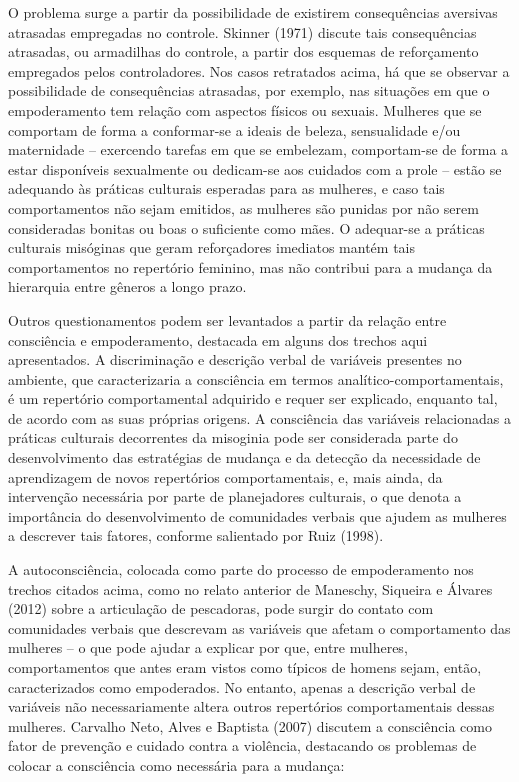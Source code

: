 O problema surge a partir da possibilidade de existirem consequências aversivas atrasadas empregadas no controle. Skinner (1971) discute tais consequências atrasadas, ou armadilhas do controle, a partir dos esquemas de reforçamento empregados pelos controladores. Nos casos retratados acima, há que se observar a possibilidade de consequências atrasadas, por exemplo, nas situações em que o empoderamento tem relação com aspectos físicos ou sexuais. Mulheres que se comportam de forma a conformar-se a ideais de beleza, sensualidade e/ou maternidade – exercendo tarefas em que se embelezam, comportam-se de forma a estar disponíveis sexualmente ou dedicam-se aos cuidados com a prole – estão se adequando às práticas culturais esperadas para as mulheres, e caso tais comportamentos não sejam emitidos, as mulheres são punidas por não serem consideradas bonitas ou boas o suficiente como mães. O adequar-se a práticas culturais misóginas que geram reforçadores imediatos mantém tais comportamentos no repertório feminino, mas não contribui para a mudança da hierarquia entre gêneros a longo prazo.

Outros questionamentos podem ser levantados a partir da relação entre consciência e empoderamento, destacada em alguns dos trechos aqui apresentados. A discriminação e descrição verbal de variáveis presentes no ambiente, que caracterizaria a consciência em termos analítico-comportamentais, é um repertório comportamental adquirido e requer ser explicado, enquanto tal, de acordo com as suas próprias origens. A consciência das variáveis relacionadas a práticas culturais decorrentes da misoginia pode ser considerada parte do desenvolvimento das estratégias de mudança e da detecção da necessidade de aprendizagem de novos repertórios comportamentais, e, mais ainda, da intervenção necessária por parte de planejadores culturais, o que denota a importância do desenvolvimento de comunidades verbais que ajudem as mulheres a descrever tais fatores, conforme salientado por Ruiz (1998).

A autoconsciência, colocada como parte do processo de empoderamento nos trechos citados acima, como no relato anterior de Maneschy, Siqueira e Álvares (2012) sobre a articulação de pescadoras, pode surgir do contato com comunidades verbais que descrevam as variáveis que afetam o comportamento das mulheres – o que pode ajudar a explicar por que, entre mulheres, comportamentos que antes eram vistos como típicos de homens sejam, então, caracterizados como empoderados. No entanto, apenas a descrição verbal de variáveis não necessariamente altera outros repertórios comportamentais dessas mulheres. Carvalho Neto, Alves e Baptista (2007) discutem a consciência como fator de prevenção e cuidado contra a violência, destacando os problemas de colocar a consciência como necessária para a mudança:

